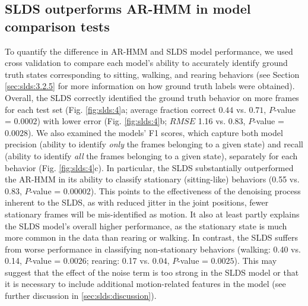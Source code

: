 \subsection{SLDS outperforms AR-HMM in model comparison tests}
\label{sec:slds:3.2.4}

To quantify the difference in AR-HMM and SLDS model performance, we used cross validation to compare each model's ability to accurately identify ground truth states corresponding to sitting, walking, and rearing behaviors (see Section \ref{sec:slds:3.2.5} for more information on how ground truth labels were obtained). Overall, the SLDS correctly identified the ground truth behavior on more frames for each test set (Fig. \ref{fig:slds:4}a; average fraction correct $0.44$ vs. $0.71$, $P$-value = $0.0002$) with lower error (Fig. \ref{fig:slds:4}b; $RMSE$ 1.16 vs. 0.83, $P$-value = $0.0028$). We also examined the models' F1 scores, which capture both model precision (ability to identify \textit{only} the frames belonging to a given state) and recall (ability to identify \textit{all} the frames belonging to a given state), separately for each behavior (Fig. \ref{fig:slds:4}c). In particular, the SLDS substantially outperformed the AR-HMM in its ability to classify stationary (sitting-like) behaviors (0.55 vs. 0.83, $P$-value = $0.00002$). This points to the effectiveness of the denoising process inherent to the SLDS, as with reduced jitter in the joint positions, fewer stationary frames will be mis-identified as motion. It also at least partly explains the SLDS model's overall higher performance, as the stationary state is much more common in the data than rearing or walking. In contrast, the SLDS suffers from worse performance in classifying non-stationary behaviors (walking: 0.40 vs. 0.14, $P$-value = $0.0026$; rearing: 0.17 vs. 0.04, $P$-value = $0.0025$). This may suggest that the effect of the noise term is too strong in the SLDS model or that it is necessary to include additional motion-related features in the model (see further discussion in \ref{sec:slds:discussion}). 

